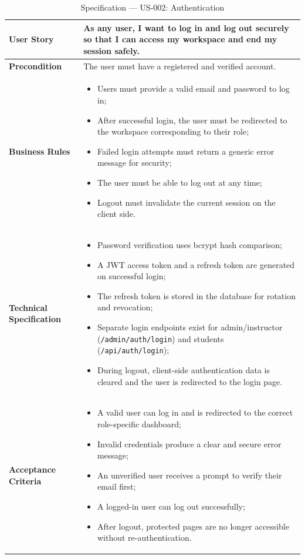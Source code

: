 \begin{table}[H]
\centering
\caption{Specification — US-002: Authentication}
\label{tab:us002}
\renewcommand{\arraystretch}{1}
\begin{tabularx}{\textwidth}{|p{2.5cm}|X|}
\hline
\textbf{User Story} & As any user, I want to log in and log out securely so that I can access my workspace and end my session safely. \\
\hline
\textbf{Precondition} & The user must have a registered and verified account. \\
\hline
\textbf{Business Rules} &
\begin{itemize}
  \item Users must provide a valid email and password to log in;
  \item After successful login, the user must be redirected to the workspace corresponding to their role;
  \item Failed login attempts must return a generic error message for security;
  \item The user must be able to log out at any time;
  \item Logout must invalidate the current session on the client side.
\end{itemize} \\
\hline
\textbf{Technical Specification} &
\begin{itemize}
  \item Password verification uses bcrypt hash comparison;
  \item A JWT access token and a refresh token are generated on successful login;
  \item The refresh token is stored in the database for rotation and revocation;
  \item Separate login endpoints exist for admin/instructor (\texttt{/admin/auth/login}) and students (\texttt{/api/auth/login});
  \item During logout, client-side authentication data is cleared and the user is redirected to the login page.
\end{itemize} \\
\hline
\textbf{Acceptance Criteria} &
\begin{itemize}
  \item A valid user can log in and is redirected to the correct role-specific dashboard;
  \item Invalid credentials produce a clear and secure error message;
  \item An unverified user receives a prompt to verify their email first;
  \item A logged-in user can log out successfully;
  \item After logout, protected pages are no longer accessible without re-authentication.
\end{itemize} \\
\hline
\end{tabularx}
\end{table}

